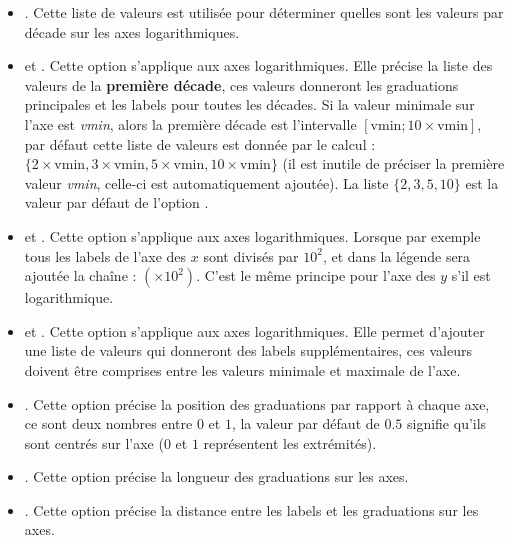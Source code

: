 \begin{itemize}
\begin{itemize}
        \item {}. Cette liste de valeurs est utilisée pour déterminer quelles sont les valeurs par décade sur les axes logarithmiques.
        
        \item {} et . Cette option s'applique aux axes logarithmiques. Elle précise la liste des valeurs de la \textbf{première décade}, ces valeurs donneront les graduations principales et les labels pour toutes les décades. Si la valeur minimale sur l'axe est \emph{vmin}, alors la première décade est l'intervalle $[\mathrm{vmin};10\times\mathrm{vmin}]$, par défaut cette liste de valeurs est donnée par le calcul : $\{2\times\mathrm{vmin}, 3\times\mathrm{vmin}, 5\times\mathrm{vmin}, 10\times\mathrm{vmin}\}$ (il est inutile de préciser la première valeur \emph{vmin}, celle-ci est automatiquement ajoutée). La liste $\{2,3,5,10\}$ est la valeur par défaut de l'option .
        
        \item {} et . Cette option s'applique aux axes logarithmiques. Lorsque par exemple  tous les labels de l'axe des $x$ sont divisés par $10^2$, et dans la légende sera ajoutée la chaîne : $(\times10^2)$. C'est le même principe pour l'axe des $y$ s'il est logarithmique.
        
        \item {} et . Cette option s'applique aux axes logarithmiques. Elle permet d'ajouter une liste de valeurs qui donneront des labels supplémentaires, ces valeurs doivent être comprises entre les valeurs minimale et maximale de l'axe.
        
        \item {}. Cette option précise la position des graduations par rapport à chaque axe, ce sont deux nombres entre $0$ et $1$, la valeur par défaut de $0.5$ signifie qu'ils sont centrés sur l'axe ($0$ et $1$ représentent les extrémités).
        
        \item {}. Cette option précise la longueur des graduations sur les axes.
        
        \item {}. Cette option précise la distance entre les labels et les graduations sur les axes.
        

\end{itemize}
\end{itemize}
